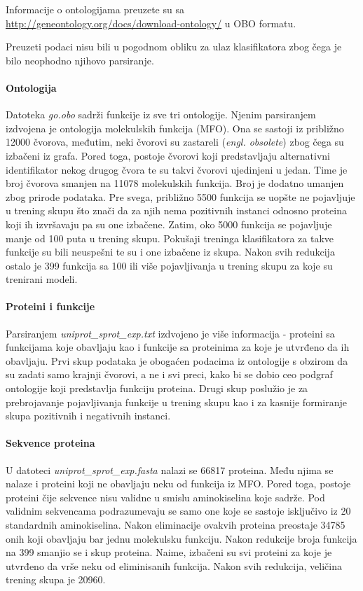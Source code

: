 Informacije o ontologijama preuzete su sa  \href{http://geneontology.org/docs/download-ontology/}{http://geneontology.org/docs/download-ontology/} u OBO formatu. 

Preuzeti podaci nisu bili u pogodnom obliku za ulaz klasifikatora zbog čega je bilo neophodno njihovo parsiranje.


\paragraph{Ontologija} Datoteka \textit{go.obo} sadrži funkcije iz sve tri ontologije. Njenim parsiranjem izdvojena je ontologija molekulskih funkcija (MFO). Ona se sastoji iz približno 12000 čvorova, međutim, neki čvorovi su zastareli (\textit{engl. obsolete}) zbog čega su izbačeni iz grafa. Pored toga, postoje čvorovi koji predstavljaju alternativni identifikator nekog drugog čvora te su takvi čvorovi ujedinjeni u jedan. Time je broj čvorova smanjen na 11078 molekulskih funkcija. Broj je dodatno umanjen zbog prirode podataka. Pre svega, približno 5500 funkcija se uopšte ne pojavljuje u trening skupu što znači da za njih nema pozitivnih instanci odnosno proteina koji ih izvršavaju pa su one izbačene. Zatim, oko 5000 funkcija se pojavljuje manje od 100 puta u trening skupu. Pokušaji treninga klasifikatora za takve funkcije su bili neuspešni te su i one izbačene iz skupa. Nakon svih redukcija ostalo je 399 funkcija sa 100 ili više pojavljivanja u trening skupu za koje su trenirani modeli.


\paragraph{Proteini i funkcije} Parsiranjem \textit{uniprot\_sprot\_exp.txt} izdvojeno je više informacija - proteini sa funkcijama koje obavljaju kao i funkcije sa proteinima za koje je utvrđeno da ih obavljaju. Prvi skup podataka je obogaćen podacima iz ontologije s obzirom da su zadati samo krajnji čvorovi, a ne i svi preci, kako bi se dobio ceo podgraf ontologije koji predstavlja funkciju proteina. Drugi skup poslužio je za prebrojavanje pojavljivanja funkcije u trening skupu kao i za kasnije formiranje skupa pozitivnih i negativnih instanci.


\paragraph{Sekvence proteina} U datoteci \textit{uniprot\_sprot\_exp.fasta} 
nalazi se 66817 proteina. Među njima se nalaze i proteini koji ne obavljaju neku od funkcija iz MFO. Pored toga, postoje proteini čije sekvence nisu validne u smislu aminokiselina koje sadrže. Pod validnim sekvencama podrazumevaju se samo one koje se sastoje isključivo iz 20 standardnih aminokiselina. Nakon eliminacije ovakvih proteina preostaje 34785 onih koji obavljaju bar jednu molekulsku funkciju. Nakon redukcije broja funkcija na 399 smanjio se i skup proteina. Naime, izbačeni su svi proteini za koje je utvrđeno da vrše neku od eliminisanih funkcija. Nakon svih redukcija, veličina trening skupa je 20960. 



